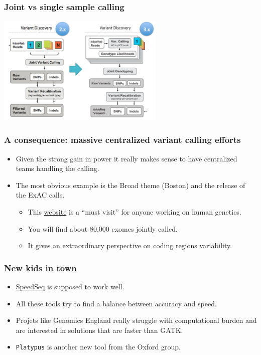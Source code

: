 \documentclass{beamer}
\begin{document}
\begin{frame}
  \frametitle{Joint vs single sample calling}
  \begin{center}
    \includegraphics[width=8cm]{fig/joint_vs_single_calling.png}
  \end{center}
\end{frame}

\begin{frame}
  \frametitle{A consequence: massive centralized variant calling efforts}
  \begin{itemize}
  \item Given the strong gain in power it really makes sense to have centralized teams handling the calling.
  \item The most obvious example is the Broad theme (Boston) and the release of the ExAC calls.
    \begin{itemize}
    \item This \href{http://exac.broadinstitute.org/}{website} is a ``must visit'' for anyone working on human genetics.
    \item You will find about 80,000 exomes jointly called.
    \item It gives an extraordinary perspective on coding regions variability.
    \end{itemize}
  \end{itemize}
\end{frame}


\begin{frame}
  \frametitle{New kids in town}
  \begin{itemize}
  \item \href{http://www.nature.com/nmeth/journal/vaop/ncurrent/full/nmeth.3505.html}{SpeedSeq} is supposed to work well.
  \item All these tools try to find a balance between accuracy and speed.
  \item Projets like Genomics England really struggle with computational burden and are interested in solutions that are faster than GATK.
  \item \texttt{Platypus} is another new tool from the Oxford group.
  \end{itemize}
\end{frame}
\end{document}
